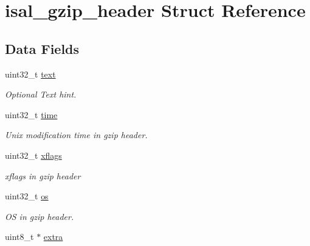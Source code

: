 \hypertarget{structisal__gzip__header}{\section{isal\-\_\-gzip\-\_\-header Struct Reference}
\label{structisal__gzip__header}
}
\subsection*{Data Fields}
\begin{DoxyCompactItemize}
\item 
\hypertarget{structisal__gzip__header_adc43e295007880ff5b0e89668f7292a4}{uint32\-\_\-t \hyperlink{structisal__gzip__header_adc43e295007880ff5b0e89668f7292a4}{text}}\label{structisal__gzip__header_adc43e295007880ff5b0e89668f7292a4}

\begin{DoxyCompactList}\small\item\em Optional Text hint. \end{DoxyCompactList}\item 
\hypertarget{structisal__gzip__header_a9b5abca0311cb57b7e03846b536e471d}{uint32\-\_\-t \hyperlink{structisal__gzip__header_a9b5abca0311cb57b7e03846b536e471d}{time}}\label{structisal__gzip__header_a9b5abca0311cb57b7e03846b536e471d}

\begin{DoxyCompactList}\small\item\em Unix modification time in gzip header. \end{DoxyCompactList}\item 
\hypertarget{structisal__gzip__header_abe25065b6394c44eb3bc78d18cea572c}{uint32\-\_\-t \hyperlink{structisal__gzip__header_abe25065b6394c44eb3bc78d18cea572c}{xflags}}\label{structisal__gzip__header_abe25065b6394c44eb3bc78d18cea572c}

\begin{DoxyCompactList}\small\item\em xflags in gzip header \end{DoxyCompactList}\item 
\hypertarget{structisal__gzip__header_a2ba793e4e1e4d771558ae0d420f0638b}{uint32\-\_\-t \hyperlink{structisal__gzip__header_a2ba793e4e1e4d771558ae0d420f0638b}{os}}\label{structisal__gzip__header_a2ba793e4e1e4d771558ae0d420f0638b}

\begin{DoxyCompactList}\small\item\em O\-S in gzip header. \end{DoxyCompactList}\item 
\hypertarget{structisal__gzip__header_a08cc64e1f0c3ccd0e61ee0fd8db20f08}{uint8\-\_\-t $\ast$ \hyperlink{structisal__gzip__header_a08cc64e1f0c3ccd0e61ee0fd8db20f08}{extra}}\label{structisal__gzip__header_a08cc64e1f0c3ccd0e61ee0fd8db20f08}


\end{DoxyCompactItemize}
